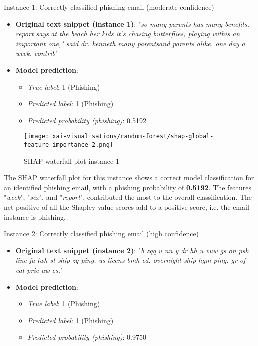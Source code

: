 \noindent Instance 1: Correctly classified phishing email (moderate confidence)

\begin{itemize}
  \item \textbf{Original text snippet (instance 1)}: "\textit{so many parents has many benefits. report says.at the beach her kids it's chasing butterflies, playing withis an important one," said dr. kenneth many parentsand parents alike. one day a week. contrib}"
  \item \textbf{Model prediction}:
  \begin{itemize}
    \item \textit{True label}: 1 (Phishing)
    \item \textit{Predicted label}: 1 (Phishing)
    \item \textit{Predicted probability (phishing)}: 0.5192
  \end{itemize}
\end{itemize}

\begin{figure}[H]
  \begin{center}
    \texttt{[image: xai-visualisations/random-forest/shap-global-feature-importance-2.png]}
    \caption{SHAP waterfall plot instance 1}
  \end{center}
\end{figure}

\noindent The SHAP waterfall plot for this instance shows a correct model classification for an identified phishing email, with a phishing probability of \textbf{0.5192}. The features "\textit{week}", "\textit{sex}", and "\textit{report}", contributed the most to the overall classification. The net positive of all the Shapley value scores add to a positive score, i.e. the email instance is phishing.\newline

\noindent Instance 2: Correctly classified phishing email (high confidence)

\begin{itemize}
  \item \textbf{Original text snippet (instance 2)}: "\textit{b zqq u nn y dr hh u vuw gs on psk line fa lwh st ship zg ping. us licens bmh ed. overnight ship hgm ping. gr of eat pric aw es.}"
  \item \textbf{Model prediction}:
  \begin{itemize}
    \item \textit{True label}: 1 (Phishing)
    \item \textit{Predicted label}: 1 (Phishing)
    \item \textit{Predicted probability (phishing)}: 0.9750
  \end{itemize}
\end{itemize}

